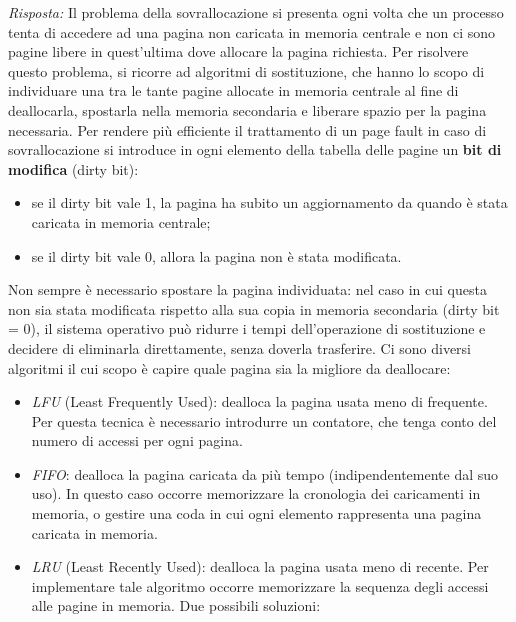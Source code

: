 \documentclass{article}
\newenvironment{solution}
    {\textit{Risposta:}}
    {}
\begin{document}
\begin{solution}
Il problema della sovrallocazione si presenta ogni volta che un processo tenta di accedere ad una pagina non caricata in memoria centrale e non ci sono pagine libere in quest’ultima dove allocare la pagina richiesta.
\newline
Per risolvere questo problema, si ricorre ad algoritmi di sostituzione, che hanno lo scopo di individuare una tra le tante pagine allocate in memoria centrale al fine di deallocarla, spostarla nella memoria secondaria e liberare spazio per la pagina necessaria.
\newline
Per rendere più efficiente il trattamento di un page fault in caso di sovrallocazione si introduce in ogni elemento della tabella delle pagine un \textbf{bit di modifica} (dirty bit):
\begin{itemize}
    \item se il dirty bit vale 1, la pagina ha subito un aggiornamento da quando è stata caricata in memoria centrale;
    \item se il dirty bit vale 0, allora la pagina non è stata modificata.
\end{itemize}
Non sempre è necessario spostare la pagina individuata: nel caso in cui questa non sia stata modificata rispetto alla sua copia in memoria secondaria (dirty bit = 0), il sistema operativo può ridurre i tempi dell’operazione di sostituzione e decidere di eliminarla direttamente, senza doverla trasferire.
\newline
Ci sono diversi algoritmi il cui scopo è capire quale pagina sia la migliore da deallocare:
\begin{itemize}
    \item \emph{LFU} (Least Frequently Used): dealloca la pagina usata meno di frequente.\newline
    Per questa tecnica è necessario introdurre un contatore, che tenga conto del numero di accessi per ogni pagina.
    \item \emph{FIFO}: dealloca la pagina caricata da più tempo (indipendentemente dal suo uso).
In questo caso occorre memorizzare la cronologia dei caricamenti in memoria, o gestire una coda in cui ogni elemento rappresenta una pagina caricata in memoria.
        \item \emph{LRU} (Least Recently Used): dealloca la pagina usata meno di recente. Per implementare tale algoritmo occorre memorizzare la sequenza degli accessi alle pagine in memoria. Due possibili soluzioni:
    \begin{itemize}

\end{itemize}
\end{itemize}
\end{solution}
\end{document}
